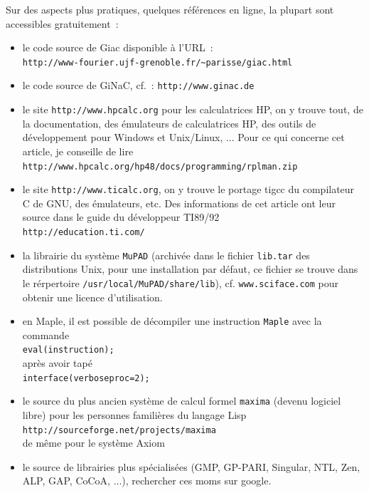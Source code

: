 \documentclass[a4paper,11pt]{article}
\begin{document}
Sur des aspects plus pratiques, quelques r\'ef\'erences en ligne, 
la plupart sont accessibles  gratuitement~:
\begin{itemize}
\item le code source de Giac disponible à l'URL~:\\
\verb|http://www-fourier.ujf-grenoble.fr/~parisse/giac.html|
\item le code source de GiNaC, cf.~:
\verb|http://www.ginac.de|
\item le site \verb|http://www.hpcalc.org| pour les calculatrices HP,
on y trouve tout, de la documentation, des \'emulateurs de
calculatrices HP, des outils de d\'eveloppement pour Windows
et Unix/Linux, ... Pour ce qui concerne cet article, je conseille de lire\\
\verb|http://www.hpcalc.org/hp48/docs/programming/rplman.zip|
\item le site \verb|http://www.ticalc.org|, on y trouve le portage
tigcc du compilateur C de GNU, des \'emulateurs, etc. Des informations de 
cet article ont leur source dans le guide du
d\'eveloppeur TI89/92\\
\verb|http://education.ti.com/|
\item la librairie du système \verb|MuPAD| (archivée dans le fichier
\verb|lib.tar| des distributions Unix, pour une installation
par d\'efaut, ce fichier
se trouve dans le r\'erpertoire \verb|/usr/local/MuPAD/share/lib|),  
cf. \verb|www.sciface.com| pour obtenir une licence
d'utilisation.
\item en Maple, il est possible de
décompiler une instruction \verb|Maple| avec la commande\\
\verb|eval(instruction);|\\
après avoir tapé\\
\verb|interface(verboseproc=2);|
\item le source du plus ancien système de calcul formel \verb|maxima|
(devenu logiciel libre) pour les personnes famili\`eres du langage Lisp\\
\verb|http://sourceforge.net/projects/maxima|\\
de m\^eme pour le syst\`eme Axiom
\item le source de librairies plus spécialisées (GMP, GP-PARI, Singular,
NTL, Zen, ALP, GAP, CoCoA, ...), rechercher ces moms sur google.
\end{itemize}

\pagebreak
\end{document}
